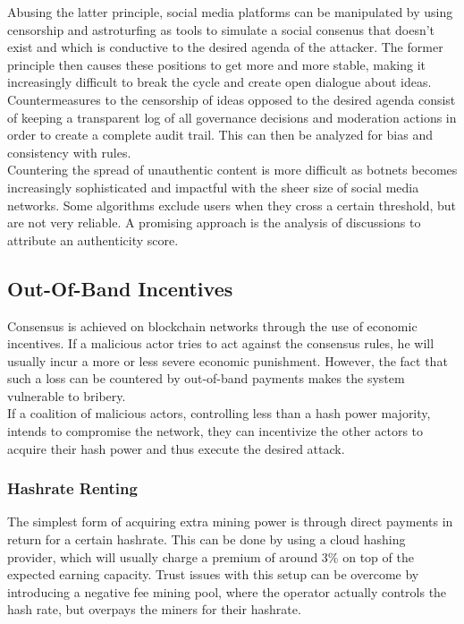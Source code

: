 \documentclass[12pt,a4paper]{article}
\begin{document}
Abusing the latter principle, social media platforms can be manipulated by using censorship and astroturfing \cite{astroturf} as tools to simulate a social consenus that doesn't exist and which is conductive to the desired agenda of the attacker. The former principle then causes these positions to get more and more stable, making it increasingly difficult to break the cycle and create open dialogue about ideas.\\

Countermeasures to the censorship of ideas opposed to the desired agenda consist of keeping a transparent log of all governance decisions and moderation actions in order to create a complete audit trail. This can then be analyzed for bias and consistency with rules.\\

Countering the spread of unauthentic content is more difficult as botnets becomes increasingly sophisticated and impactful with the sheer size of social media networks. Some algorithms exclude users when they cross a certain threshold, but are not very reliable. A promising approach is the analysis of discussions to attribute an authenticity score.\\

\subsection{Out-Of-Band Incentives}

Consensus is achieved on blockchain networks through the use of economic incentives. If a malicious actor tries to act against the consensus rules, he will usually incur a more or less severe economic punishment. However, the fact that such a loss can be countered by out-of-band payments makes the system vulnerable to bribery.\\

If a coalition of malicious actors, controlling less than a hash power majority, intends to compromise the network, they can incentivize the other actors to acquire their hash power and thus execute the desired attack.\\

\subsubsection{Hashrate Renting}

The simplest form of acquiring extra mining power is through direct payments in return for a certain hashrate. This can be done by using a cloud hashing provider, which will usually charge a premium of around 3\% on top of the expected earning capacity. Trust issues with this setup can be overcome by introducing a negative fee mining pool, where the operator actually controls the hash rate, but overpays the miners for their hashrate.\\
\end{document}
